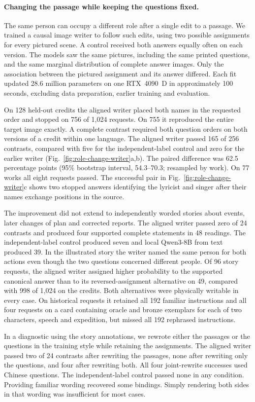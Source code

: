 \paragraph{Changing the passage while keeping the questions fixed.}
The same person can occupy a different role after a single edit to a passage. We trained a causal image writer to follow such edits, using two possible assignments for every pictured scene. A control received both answers equally often on each version. The models saw the same pictures, including the same printed questions, and the same marginal distribution of complete answer images. Only the association between the pictured assignment and its answer differed. Each fit updated 28.6 million parameters on one RTX~4090~D in approximately 100 seconds, excluding data preparation, earlier training and evaluation.

On 128 held-out credits the aligned writer placed both names in the requested order and stopped on 756 of 1,024 requests. On 755 it reproduced the entire target image exactly. A complete contrast required both question orders on both versions of a credit within one language. The aligned writer passed 165 of 256 contrasts, compared with five for the independent-label control and zero for the earlier writer (Fig.~\ref{fig:role-change-writer}a,b). The paired difference was 62.5 percentage points (95\% bootstrap interval, 54.3--70.3; resampled by work). On 77 works all eight requests passed. The successful pair in Fig.~\ref{fig:role-change-writer}c shows two stopped answers identifying the lyricist and singer after their names exchange positions in the source.

The improvement did not extend to independently worded stories about events, later changes of plan and corrected reports. The aligned writer passed zero of 24 contrasts and produced four supported complete statements in 48 readings. The independent-label control produced seven and local Qwen3-8B from text produced 39. In the illustrated story the writer named the same person for both actions even though the two questions concerned different people. Of 96 story requests, the aligned writer assigned higher probability to the supported canonical answer than to its reversed-assignment alternative on 49, compared with 998 of 1,024 on the credits. Both alternatives were physically writable in every case. On historical requests it retained all 192 familiar instructions and all four requests on a card containing oracle and bronze exemplars for each of two characters, speech and expedition, but missed all 192 rephrased instructions.

In a diagnostic using the story annotations, we rewrote either the passages or the questions in the training style while retaining the assignments. The aligned writer passed two of 24 contrasts after rewriting the passages, none after rewriting only the questions, and four after rewriting both. All four joint-rewrite successes used Chinese questions. The independent-label control passed none in any condition. Providing familiar wording recovered some bindings. Simply rendering both sides in that wording was insufficient for most cases.

